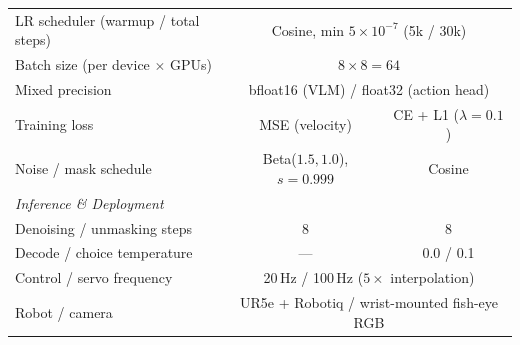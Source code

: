 \documentclass{article}
\begin{document}
\begin{table}[h]
\begin{tabular}{lcc}
LR scheduler (warmup / total steps) & \multicolumn{2}{c}{Cosine, min $5{\times}10^{-7}$ (5k / 30k)} \\
Batch size (per device $\times$ GPUs) & \multicolumn{2}{c}{$8 \times 8 = 64$} \\
Mixed precision & \multicolumn{2}{c}{bfloat16 (VLM) / float32 (action head)} \\
Training loss & MSE (velocity) & CE + L1 ($\lambda{=}0.1$) \\
Noise / mask schedule & Beta($1.5, 1.0$), $s{=}0.999$ & Cosine \\
\midrule
\multicolumn{3}{l}{\textit{Inference \& Deployment}} \\
Denoising / unmasking steps & 8 & 8 \\
Decode / choice temperature & --- & 0.0 / 0.1 \\
Control / servo frequency & \multicolumn{2}{c}{20\,Hz / 100\,Hz ($5\times$ interpolation)} \\
Robot / camera & \multicolumn{2}{c}{UR5e + Robotiq / wrist-mounted fish-eye RGB} \\
\bottomrule
\end{tabular}
\end{table}
\end{document}
